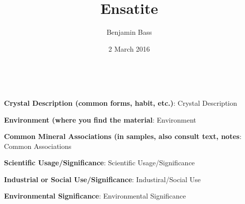 \documentclass[10pt]{article}
\author{Benjamin Bass}
\date{2 March 2016}
\title{\vspace{-2.0cm}Ensatite} %
\begin{document}
\maketitle




\
\
\
\
\
\
\
\
\
\

\begin{framed}
  \textbf{Crystal Description (common forms, habit, etc.)}:  Crystal Description
\end{framed}

\begin{framed}
  \textbf{Environment (where you find the material}:  Environment
\end{framed}

\begin{framed}
  \textbf{Common Mineral Associations (in samples, also consult text, notes}:  Common Associations
\end{framed}

\begin{framed}
  \textbf{Scientific Usage/Significance}:  Scientific Usage/Significance
\end{framed}

\begin{framed}
  \textbf{Industrial or Social Use/Significance}:  Industiral/Social Use
\end{framed}

\begin{framed}
  \textbf{Environmental Significance}:  Environmental Significance
\end{framed}


\end{document}
